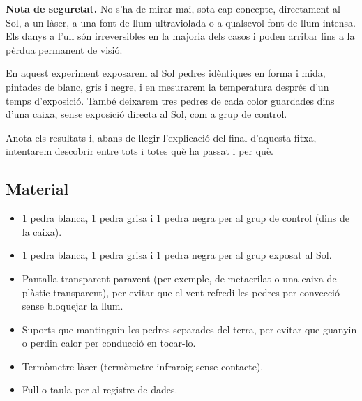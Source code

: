 
\begin{tcolorbox}[
    colback=white,
    colframe=black!40,
    boxrule=0.6pt,
    arc=2mm,
    left=3mm,
    right=3mm,
    top=2mm,
    bottom=2mm
]
\textbf{Nota de seguretat.} No s’ha de mirar mai, sota cap concepte, directament al Sol, a un làser, a una font de llum ultraviolada o a qualsevol font de llum intensa. Els danys a l’ull són irreversibles en la majoria dels casos i poden arribar fins a la pèrdua permanent de visió.
\end{tcolorbox}



En aquest experiment exposarem al Sol pedres idèntiques en forma i mida, pintades de blanc, gris i negre, i en mesurarem la temperatura després d’un temps d’exposició. També deixarem tres pedres de cada color guardades dins d’una caixa, sense exposició directa al Sol, com a grup de control.

Anota els resultats i, abans de llegir l’explicació del final d’aquesta fitxa, intentarem descobrir entre tots i totes què ha passat i per què.

\subsection{Material}

\begin{itemize}

    \item 1 pedra blanca, 1 pedra grisa i 1 pedra negra per al grup de control (dins de la caixa).

    \item 1 pedra blanca, 1 pedra grisa i 1 pedra negra per al grup exposat al Sol.

    \item Pantalla transparent paravent (per exemple, de metacrilat o una caixa de plàstic transparent), per evitar que el vent refredi les pedres per convecció sense bloquejar la llum.

    \item Suports que mantinguin les pedres separades del terra, per evitar que guanyin o perdin calor per conducció en tocar-lo.

    \item Termòmetre làser (termòmetre infraroig sense contacte).

    \item Full o taula per al registre de dades.

\end{itemize}


